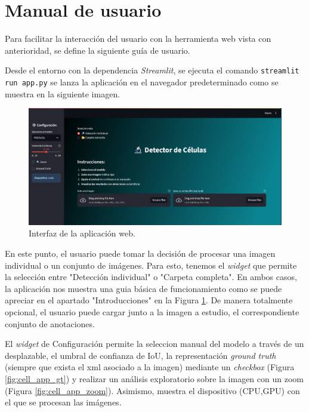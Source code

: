 \documentclass[12pt,a4paper,onecolumn,oneside]{report}
\begin{document}
\section{Manual de usuario}
\label{Manual de usuario}
Para facilitar la interacción del usuario con la herramienta web vista con anterioridad, se define la siguiente guía de usuario.

Desde el entorno con la dependencia \textit{Streamlit}, se ejecuta el comando \texttt{streamlit run app.py}  se lanza la aplicación en el navegador predeterminado
como se muestra en la siguiente imagen.

\begin{figure}[htbp]
  \centering
  \includegraphics[width=1.0\textwidth]{figuras/app/cell_app.png}
  \caption{Interfaz de la aplicación web.}
  \label{fig:cell_app}
\end{figure}

En este punto, el usuario puede tomar la decisión de procesar una imagen individual o un conjunto de imágenes. Para esto, 
tenemos el \textit{widget} que permite la selección entre "Detección individual" o "Carpeta completa". En ambos casos,
la aplicación nos muestra una guia básica de funcionamiento como se puede apreciar en el apartado "Introducciones" en la Figura \ref{fig:cell_app}.
De manera totalmente opcional, el usuario puede cargar junto a la imagen a estudio, el correspondiente conjunto de anotaciones.

El \textit{widget} de Configuración permite la seleccion manual del modelo a través de un desplazable, el umbral de confianza de IoU, 
la representación \textit{ground truth} (siempre que exista el xml asociado a la imagen) mediante un \textit{checkbox} (Figura \ref{fig:cell_app_gt}) y realizar un análisis exploratorio
sobre la imagen con un zoom (Figura \ref{fig:cell_app_zoom}). Asimismo, muestra el dispositivo (CPU,GPU) con el que se procesan las imágenes.
\end{document}
